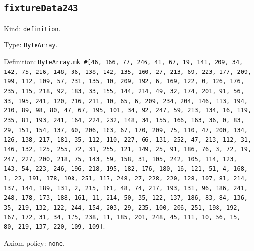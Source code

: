 \documentclass[11pt]{article}
\begin{document}
\subsection*{\texttt{fixtureData243}}
\noindent Kind: \texttt{definition}.\par
\noindent Type: \texttt{ByteArray}.\par
\noindent Definition: \texttt{ByteArray.mk \#[46, 166, 77, 246, 41, 67, 19, 141, 209, 34, 142, 75, 216, 148, 36, 138, 142, 135, 160, 27, 213, 69, 223, 177, 209, 199, 112, 109, 57, 231, 135, 10, 209, 192, 6, 169, 122, 0, 126, 176, 235, 115, 218, 92, 183, 33, 155, 144, 214, 49, 32, 174, 201, 91, 56, 33, 195, 241, 120, 216, 211, 10, 65, 6, 209, 234, 204, 146, 113, 194, 210, 89, 98, 80, 47, 67, 195, 101, 34, 92, 247, 59, 213, 134, 16, 119, 235, 81, 193, 241, 164, 224, 232, 148, 34, 155, 166, 163, 36, 0, 83, 29, 151, 154, 137, 60, 206, 103, 67, 170, 209, 75, 110, 47, 200, 134, 126, 138, 217, 181, 35, 112, 110, 227, 66, 131, 252, 47, 213, 112, 31, 146, 132, 125, 255, 72, 31, 255, 121, 149, 25, 91, 186, 76, 3, 72, 19, 247, 227, 200, 218, 75, 143, 59, 158, 31, 105, 242, 105, 114, 123, 143, 54, 223, 246, 196, 218, 195, 182, 176, 180, 16, 121, 51, 4, 168, 1, 22, 191, 178, 198, 251, 117, 248, 27, 228, 220, 128, 107, 81, 214, 137, 144, 189, 131, 2, 215, 161, 48, 74, 217, 193, 131, 96, 186, 241, 248, 178, 173, 188, 161, 11, 214, 50, 35, 122, 137, 186, 83, 84, 136, 35, 219, 132, 122, 244, 154, 203, 29, 235, 100, 206, 251, 198, 192, 167, 172, 31, 34, 175, 238, 11, 185, 201, 248, 45, 111, 10, 56, 15, 80, 219, 137, 220, 109, 109]}.\par
\noindent Axiom policy: \texttt{none}.\par
\end{document}

